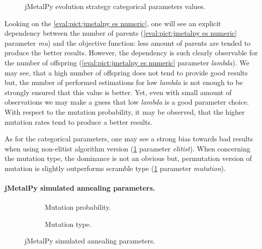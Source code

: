\begin{figure}[h!]
	\centering
	\vspace{-20pt}
	
	\caption{jMetalPy evolution strategy categorical parameters values.}
	\label{eval:pict:jmetalpy es categoric}
	\vspace{-20pt}
\end{figure}

Looking on the \cref{eval:pict:jmetalpy es numeric}, one will see an explicit dependency between the number of parents (\cref{eval:pict:jmetalpy es numeric} parameter \emph{mu}) and the objective function: less amount of parents are tended to produce the better results. However, the dependency is such clearly observable for the number of offspring (\cref{eval:pict:jmetalpy es numeric} parameter \emph{lambda}). We may see, that a high number of offspring does not tend to provide good results but, the number of performed estimations for low \emph{lambda} is not enough to be strongly ensured that this value is better. Yet, even with small amount of observations we may make a guess that low \emph{lambda} is a good parameter choice. With respect to the mutation probability, it may be observed, that the higher mutation rates tend to produce a better results. 

As for the categorical parameters, one may see a strong bias towards bad results when using non-elitist algorithm version (\cref{eval:pict:jmetalpy es categoric} parameter \emph{elitist}). When concerning the mutation type, the dominance is not an obvious but, permutation version of mutation is slightly outperforms scramble type (\cref{eval:pict:jmetalpy es categoric} parameter \emph{mutation}).


\paragraph{jMetalPy simulated annealing parameters.}
\begin{figure}[h]
	\centering
	\begin{subfigure}{0.35\textwidth}
		\vspace{-10pt}
		
		\caption{Mutation probability.}
		\label{eval:pict:jmetalpy sa numeric}
	\end{subfigure}
	\hfil 
	\begin{subfigure}{0.4\textwidth}
		
		\vspace{-5pt}
		\caption{Mutation type.}
		\label{eval:pict:jmetalpy sa categoric}
	\end{subfigure}
	\caption{jMetalPy simulated annealing parameters.}
\end{figure}


